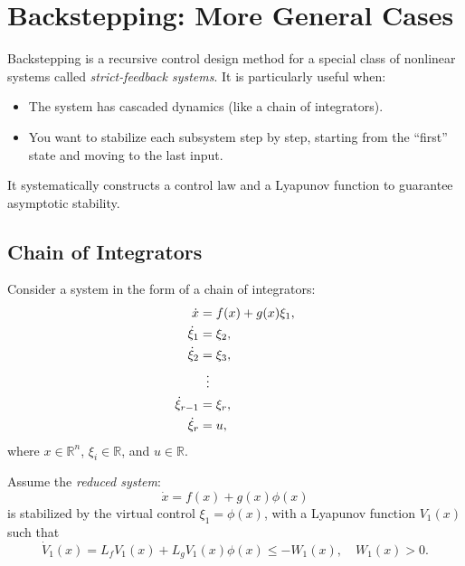 \section{Backstepping: More General Cases}

Backstepping is a recursive control design method for a special class of nonlinear systems called \textit{strict-feedback systems}. It is particularly useful when:

\begin{itemize}
\item The system has cascaded dynamics (like a chain of integrators).

\item You want to stabilize each subsystem step by step, starting from the “first” state and moving to the last input.
\end{itemize}

It systematically constructs a control law and a Lyapunov function to guarantee asymptotic stability.

\subsection{Chain of Integrators}

Consider a system in the form of a chain of integrators:
\begin{align}
    \dot{x} &= f(x) + g(x)\xi_1, \\
    \dot{\xi}_1 &= \xi_2, \\
    \dot{\xi}_2 &= \xi_3, \\
    &\;\;\vdots \notag\\
    \dot{\xi}_{r-1} &= \xi_r, \\
    \dot{\xi}_r &= u,
\end{align}
where $x \in \mathbb{R}^n$, $\xi_i \in \mathbb{R}$, and $u \in \mathbb{R}$.  

Assume the \textit{reduced system}:
\[
\dot{x} = f(x) + g(x)\phi(x)
\]
is stabilized by the virtual control $\xi_1 = \phi(x)$, with a Lyapunov function $V_1(x)$ such that
\[
\dot{V}_1(x) = L_f V_1(x) + L_g V_1(x) \phi(x) \leq -W_1(x), \quad W_1(x) > 0.
\]

